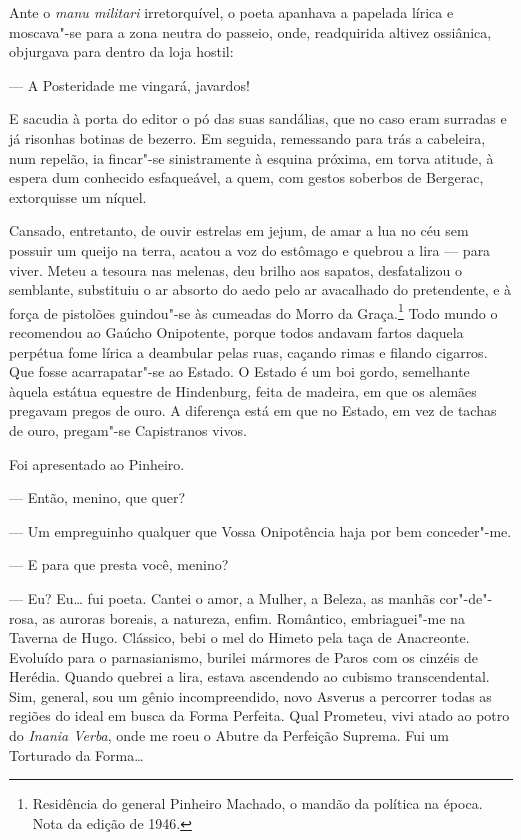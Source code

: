 Ante o \emph{manu militari} irretorquível, o poeta apanhava a papelada
lírica e moscava"-se para a zona neutra do passeio, onde, readquirida
altivez ossiânica, objurgava para dentro da loja hostil:

--- A Posteridade me vingará, javardos!

E sacudia à porta do editor o pó das suas sandálias, que no caso eram
surradas e já risonhas botinas de bezerro. Em seguida, remessando para
trás a cabeleira, num repelão, ia fincar"-se sinistramente à esquina
próxima, em torva atitude, à espera dum conhecido esfaqueável, a quem,
com gestos soberbos de Bergerac, extorquisse um níquel.

Cansado, entretanto, de ouvir estrelas em jejum, de amar a lua no céu
sem possuir um queijo na terra, acatou a voz do estômago e quebrou a
lira --- para viver. Meteu a tesoura nas melenas, deu brilho aos
sapatos, desfatalizou o semblante, substituiu o ar absorto do aedo pelo
ar avacalhado do pretendente, e à força de pistolões guindou"-se às
cumeadas do Morro da Graça.\footnote{Residência do general Pinheiro
  Machado, o mandão da política na época. Nota da edição de 1946.} Todo
mundo o recomendou ao Gaúcho Onipotente, porque todos andavam fartos
daquela perpétua fome lírica a deambular pelas ruas, caçando rimas e
filando cigarros. Que fosse acarrapatar"-se ao Estado. O Estado é um boi
gordo, semelhante àquela estátua equestre de Hindenburg, feita de
madeira, em que os alemães pregavam pregos de ouro. A diferença está em
que no Estado, em vez de tachas de ouro, pregam"-se Capistranos vivos.

Foi apresentado ao Pinheiro.

--- Então, menino, que quer?

--- Um empreguinho qualquer que Vossa Onipotência haja por bem
conceder"-me.

--- E para que presta você, menino?

--- Eu? Eu\ldots{} fui poeta. Cantei o amor, a Mulher, a Beleza, as manhãs
cor"-de"-rosa, as auroras boreais, a natureza, enfim. Romântico,
embriaguei"-me na Taverna de Hugo. Clássico, bebi o mel do Himeto pela
taça de Anacreonte. Evoluído para o parnasianismo, burilei mármores de
Paros com os cinzéis de Herédia. Quando quebrei a lira, estava
ascendendo ao cubismo transcendental. Sim, general, sou um gênio
incompreendido, novo Asverus a percorrer todas as regiões do ideal em
busca da Forma Perfeita. Qual Prometeu, vivi atado ao potro do
\emph{Inania Verba}, onde me roeu o Abutre da Perfeição Suprema. Fui um
Torturado da Forma\ldots{}

